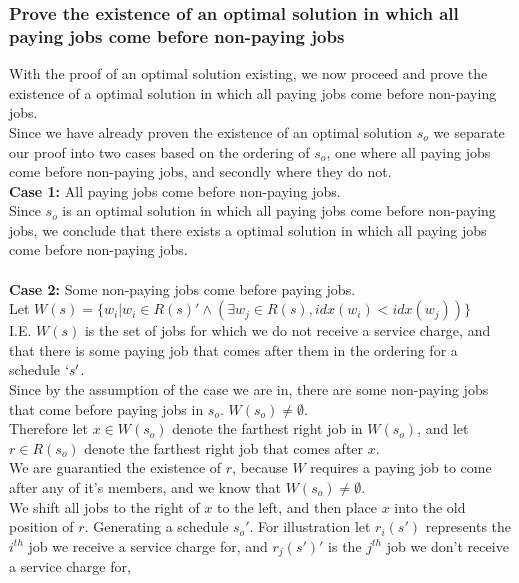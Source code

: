 \documentclass{article}
\begin{document}
      \subsubsection{Prove the existence of an optimal solution in which all paying jobs come before non-paying jobs}
        With the proof of an optimal solution existing, we now proceed and prove the existence of a optimal solution in which all paying jobs come before non-paying jobs. \\
        Since we have already proven the existence of an optimal solution $s_{o}$ we separate our proof into two cases based on the ordering of $s_{o}$, one where all paying jobs come before non-paying jobs, and secondly where they do not. \\
        \textbf{Case 1:} All paying jobs come before non-paying jobs. \\
          Since $s_{o}$ is an optimal solution in which all paying jobs come before non-paying jobs, we conclude that there exists a optimal solution in which all paying jobs come before non-paying jobs. \\
          \\
        \textbf{Case 2:} Some non-paying jobs come before paying jobs. \\
          Let $W(s) = \{w_{i} | w_{i} \in R(s)' \land (\exists w_{j} \in R(s), idx(w_{i}) < idx(w_{j}))\}$ \\
          I.E. $W(s)$ is the set of jobs for which we do not receive a service charge, and that there is some paying job that comes after them in the ordering for a schedule $`s'$. \\
          Since by the assumption of the case we are in, there are some non-paying jobs that come before paying jobs in $s_{o}$. $W(s_{o}) \neq \emptyset$. \\
          Therefore let $x \in W(s_{o})$ denote the farthest right job in $W(s_{o})$, and let $r \in R(s_{o})$ denote the farthest right job that comes after $x$. \\
          We are guarantied the existence of $r$, because $W$ requires a paying job to come after any of it's members, and we know that $W(s_{o}) \neq \emptyset$. \\
          We shift all jobs to the right of $x$ to the left, and then place $x$ into the old position of $r$. Generating a schedule $s_{o}'$.
          For illustration let $r_{i}(s')$ represents the $i^{th}$ job we receive a service charge for, and $r_{j}(s')'$ is the $j^{th}$ job we don't receive a service charge for, \\
\end{document}
